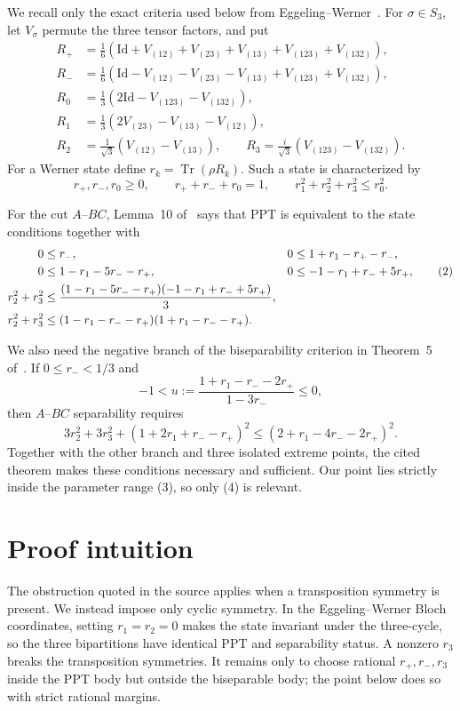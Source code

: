 \documentclass[11pt]{article}
\newcommand{\tr}{\operatorname{Tr}}
\newcommand{\id}{\mathrm{Id}}
\begin{document}
We recall only the exact criteria used below from Eggeling--Werner~\cite{EW}.
For $\sigma\in S_3$, let $V_\sigma$ permute the three tensor factors, and put
\begin{align*}
R_+&=\tfrac16(\id+V_{(12)}+V_{(23)}+V_{(13)}+V_{(123)}+V_{(132)}),\\
R_-&=\tfrac16(\id-V_{(12)}-V_{(23)}-V_{(13)}+V_{(123)}+V_{(132)}),\\
R_0&=\tfrac13(2\id-V_{(123)}-V_{(132)}),\\
R_1&=\tfrac13(2V_{(23)}-V_{(13)}-V_{(12)}),\\
R_2&=\tfrac1{\sqrt3}(V_{(12)}-V_{(13)}),\qquad
R_3=\tfrac{i}{\sqrt3}(V_{(123)}-V_{(132)}).
\end{align*}
For a Werner state define $r_k=\tr(\rho R_k)$.  Such a state is characterized
by
\[
 r_+,r_-,r_0\ge0,\qquad r_++r_-+r_0=1,\qquad
 r_1^2+r_2^2+r_3^2\le r_0^2.                                          \tag{1}
\]

For the cut $A$--$BC$, Lemma~10 of~\cite{EW} says that PPT is equivalent to
the state conditions together with
\begin{align}
0&\le r_-,&
0&\le1+r_1-r_+-r_-,\notag\\
0&\le1-r_1-5r_--r_+,&
0&\le-1-r_1+r_-+5r_+,                                                 \tag{2}\\
r_2^2+r_3^2&\le
 \frac{(1-r_1-5r_--r_+)(-1-r_1+r_-+5r_+)}3,\notag\\
r_2^2+r_3^2&\le(1-r_1-r_--r_+)(1+r_1-r_--r_+).\notag
\end{align}

We also need the negative branch of the biseparability criterion in
Theorem~5 of~\cite{EW}.  If $0\le r_-<1/3$ and
\[
 -1<u:=\frac{1+r_1-r_--2r_+}{1-3r_-}\le0,                             \tag{3}
\]
then $A$--$BC$ separability requires
\[
 3r_2^2+3r_3^2+(1+2r_1+r_--r_+)^2
 \le(2+r_1-4r_--2r_+)^2.                                             \tag{4}
\]
Together with the other branch and three isolated extreme points, the cited
theorem makes these conditions necessary and sufficient.  Our point lies
strictly inside the parameter range (3), so only (4) is relevant.

\section{Proof intuition}

The obstruction quoted in the source applies when a transposition symmetry is
present.  We instead impose only cyclic symmetry.  In the Eggeling--Werner
Bloch coordinates, setting $r_1=r_2=0$ makes the state invariant under the
three-cycle, so the three bipartitions have identical PPT and separability
status.  A nonzero $r_3$ breaks the transposition symmetries.  It remains only
to choose rational $r_+,r_-,r_3$ inside the PPT body but outside the
biseparable body; the point below does so with strict rational margins.
\end{document}
